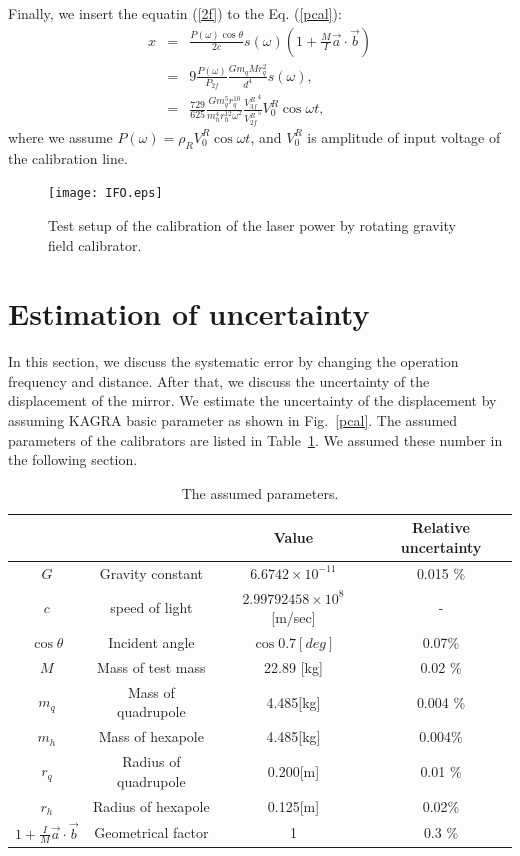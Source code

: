 \documentclass[A4]{spie}  %
\begin{document}
Finally, we insert the equatin (\ref{2f}) to the Eq. (\ref{pcal}):
\begin{eqnarray}
x&=&\frac{P(\omega) \cos{\theta}}{2c} s(\omega)\left(1+\frac{M}{I}\vec{a} \cdot \vec{b} \right) \\
 &=&9\frac{P(\omega)}{P_{2f}}\frac{Gm_q M r_q^2}{d^4}s(\omega) , \\
 &=&\frac{729}{625} \frac{G m^5_q r_{q}^{10}}{m^4_h r_h^{12} \omega^2} \frac{{V_{3f}^{R}}^4}{{V_{2f}^{R}}^5}V^R_0 \cos{\omega t} , \label{pcal_new}
\end{eqnarray}
where we assume $P(\omega)=\rho_R V^R_0 \cos {\omega t}$, and $V_0^R$ is amplitude of input voltage of the calibration line.
\begin{figure}
\begin{center}
\texttt{[image: IFO.eps]}
\caption{Test setup of the calibration of the laser power by rotating gravity field calibrator.}
\label{fig:IFO}
\end{center}
\end{figure}

\section{Estimation of uncertainty} \label{sec:EST}
In this section, we discuss the systematic error by changing the operation frequency and distance. After that, we discuss the uncertainty of the displacement of the mirror. 
We estimate the uncertainty of the displacement by assuming KAGRA basic parameter as shown in Fig.~\ref{pcal}. The assumed parameters of the calibrators are listed in Table~\ref{sus}. We assumed these number in the following section.

\begin{table}
\begin{center}
\caption{\label{sus}The assumed parameters.}
\footnotesize
\begin{tabular}{cccc}
\hline
&&Value&Relative uncertainty \\
\hline
$G$& Gravity constant&$6.6742 \times 10^{-11}$&0.015 \%\\
$c$& speed of light&$2.99792458 \times 10^8$ [m/sec]& -\\
$\cos{\theta}$& Incident angle&$\cos{0.7[deg]}$& 0.07\%\\
$M$& Mass of test mass&22.89 [kg] & 0.02 \%\\
$m_q$&Mass of quadrupole&4.485[kg] & 0.004 \%\\
$m_h$&Mass of hexapole& 4.485[kg] &0.004\%\\
$r_q$&Radius of quadrupole&0.200[m] & 0.01 \%\\
$r_h$&Radius of hexapole& 0.125[m] & 0.02\%\\
$1+\frac{I}{M}\vec{a}\cdot \vec{b}$& Geometrical factor & 1&0.3 \% \\
\hline
\end{tabular}\\
\end{center}
\end{table}
\end{document}
